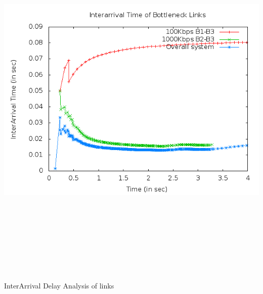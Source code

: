 \documentclass[a4paper,12pt]{report}
\begin{document}
\begin{center}
 \includegraphics[width=15 cm,height=18cm]{./link_interarrival.png}

InterArrival Delay Analysis of links
\end{center}
\end{document}
